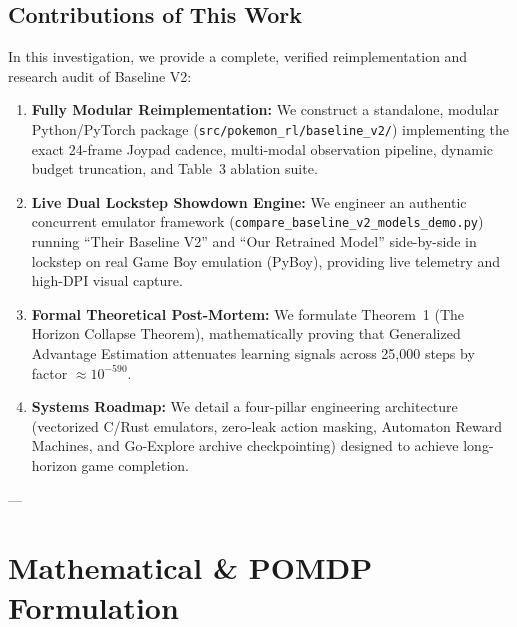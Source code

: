 \documentclass[conference]{IEEEtran}
\begin{document}
\subsection{Contributions of This Work}
In this investigation, we provide a complete, verified reimplementation and research audit of Baseline V2:
\begin{enumerate}
    \item \textbf{Fully Modular Reimplementation:} We construct a standalone, modular Python/PyTorch package (\texttt{src/pokemon\_rl/baseline\_v2/}) implementing the exact 24-frame Joypad cadence, multi-modal observation pipeline, dynamic budget truncation, and Table~3 ablation suite.
    \item \textbf{Live Dual Lockstep Showdown Engine:} We engineer an authentic concurrent emulator framework (\texttt{compare\_baseline\_v2\_models\_demo.py}) running ``Their Baseline V2'' and ``Our Retrained Model'' side-by-side in lockstep on real Game Boy emulation (PyBoy), providing live telemetry and high-DPI visual capture.
    \item \textbf{Formal Theoretical Post-Mortem:} We formulate Theorem~1 (The Horizon Collapse Theorem), mathematically proving that Generalized Advantage Estimation attenuates learning signals across 25,000 steps by factor $\approx 10^{-590}$.
    \item \textbf{Systems Roadmap:} We detail a four-pillar engineering architecture (vectorized C/Rust emulators, zero-leak action masking, Automaton Reward Machines, and Go-Explore archive checkpointing) designed to achieve long-horizon game completion.
\end{enumerate}

---

\section{Mathematical \& POMDP Formulation}
\end{document}
